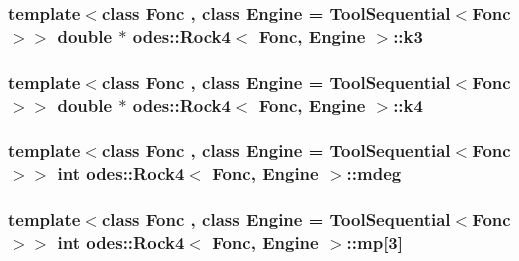 \hypertarget{classodes_1_1Rock4_a710b013eeed6e9959063a6a444dd9a12}{
\subsubsection[{k3}]{\setlength{\rightskip}{0pt plus 5cm}template$<$class Fonc , class Engine  = Tool\-Sequential$<$\-Fonc$>$$>$ double $\ast$ {\bf odes\-::\-Rock4}$<$ Fonc, Engine $>$\-::k3\hspace{0.3cm}{\ttfamily [private]}}}\label{classodes_1_1Rock4_a710b013eeed6e9959063a6a444dd9a12}
\hypertarget{classodes_1_1Rock4_ad9bed2973a3e0748ecdaffefed8dffbd}{
\subsubsection[{k4}]{\setlength{\rightskip}{0pt plus 5cm}template$<$class Fonc , class Engine  = Tool\-Sequential$<$\-Fonc$>$$>$ double $\ast$ {\bf odes\-::\-Rock4}$<$ Fonc, Engine $>$\-::k4\hspace{0.3cm}{\ttfamily [private]}}}\label{classodes_1_1Rock4_ad9bed2973a3e0748ecdaffefed8dffbd}
\hypertarget{classodes_1_1Rock4_a80db44ee8d908fcb96ca4d6075a46ee4}{
\subsubsection[{mdeg}]{\setlength{\rightskip}{0pt plus 5cm}template$<$class Fonc , class Engine  = Tool\-Sequential$<$\-Fonc$>$$>$ int {\bf odes\-::\-Rock4}$<$ Fonc, Engine $>$\-::mdeg\hspace{0.3cm}{\ttfamily [private]}}}\label{classodes_1_1Rock4_a80db44ee8d908fcb96ca4d6075a46ee4}
\hypertarget{classodes_1_1Rock4_a42b5b3858362b8a16c7627a46314fa9e}{
\subsubsection[{mp}]{\setlength{\rightskip}{0pt plus 5cm}template$<$class Fonc , class Engine  = Tool\-Sequential$<$\-Fonc$>$$>$ int {\bf odes\-::\-Rock4}$<$ Fonc, Engine $>$\-::mp\mbox{[}3\mbox{]}\hspace{0.3cm}{\ttfamily [private]}}}\label{classodes_1_1Rock4_a42b5b3858362b8a16c7627a46314fa9e}
